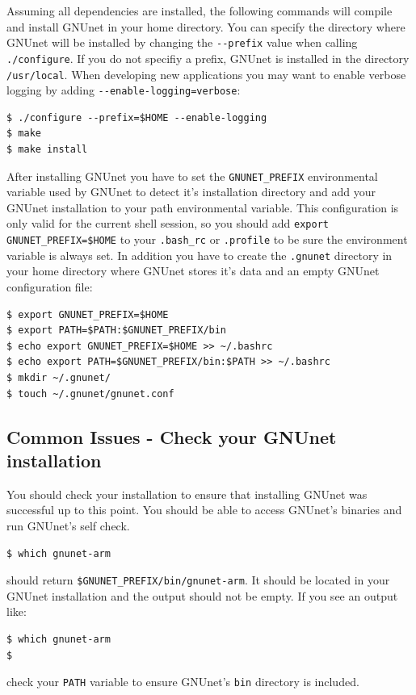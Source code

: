 \documentclass[10pt]{article}
\begin{document}
\label{sub:install}
Assuming all dependencies are installed, the following commands will compile and install GNUnet in your 
home directory. You can specify the directory where GNUnet will be installed by changing the \lstinline|--prefix| value when calling \lstinline|./configure|.  If you do not specifiy a prefix, GNUnet is installed in the directory \lstinline|/usr/local|. When developing new applications you may want to enable 
verbose logging by adding \lstinline|--enable-logging=verbose|:

\lstset{language=bash}
\begin{lstlisting}
$ ./configure --prefix=$HOME --enable-logging
$ make
$ make install 
\end{lstlisting}

After installing GNUnet you have to set the \lstinline|GNUNET_PREFIX| environmental variable used by GNUnet to detect it's installation directory and add your GNUnet installation to your path environmental variable.
This configuration is only valid for the current shell session, so you should add \lstinline|export GNUNET_PREFIX=$HOME| to your \lstinline|.bash_rc| or \lstinline|.profile| to be sure the environment variable is always set. In addition you have to create the \lstinline|.gnunet| directory in your home directory where GNUnet stores it's data and an empty GNUnet configuration file:

\lstset{language=bash}
\begin{lstlisting}
$ export GNUNET_PREFIX=$HOME 
$ export PATH=$PATH:$GNUNET_PREFIX/bin
$ echo export GNUNET_PREFIX=$HOME >> ~/.bashrc
$ echo export PATH=$GNUNET_PREFIX/bin:$PATH >> ~/.bashrc
$ mkdir ~/.gnunet/
$ touch ~/.gnunet/gnunet.conf
\end{lstlisting}

\subsection{Common Issues - Check your GNUnet installation}
You should check your installation to ensure that installing GNUnet was successful up to this point. You should be able to access GNUnet's binaries and run GNUnet's self check.
\begin{lstlisting}
$ which gnunet-arm 
\end{lstlisting}
should return \lstinline|$GNUNET_PREFIX/bin/gnunet-arm|. It should be located in your GNUnet installation and the output should not be empty. If you see an output like:
\begin{lstlisting}
$ which gnunet-arm
$ 
\end{lstlisting}
check your {\tt PATH} variable to ensure GNUnet's {\tt bin} directory is included.
\end{document}
